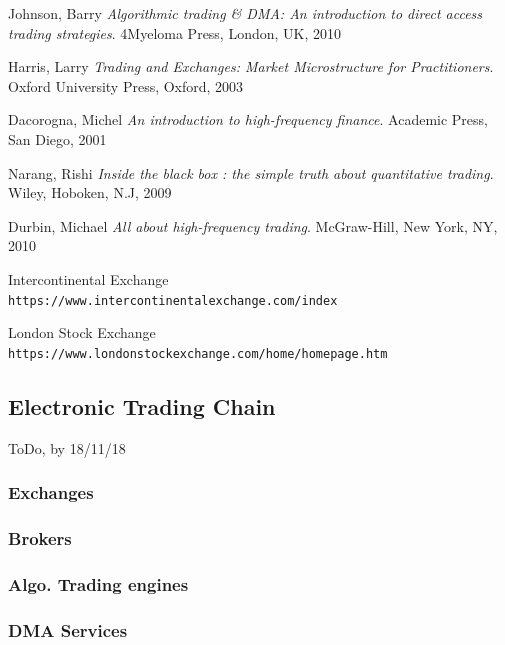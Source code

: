 \documentclass[12pt]{article}
\begin{document}
\begin{thebibliography}{9}

%

Johnson, Barry
\textit{Algorithmic trading \& DMA: An introduction to direct access trading strategies}.
4Myeloma Press, London, UK, 2010

Harris, Larry
\textit{Trading and Exchanges: Market Microstructure for Practitioners}.
Oxford University Press, Oxford, 2003

Dacorogna, Michel
\textit{An introduction to high-frequency finance}.
Academic Press, San Diego, 2001

Narang, Rishi
\textit{Inside the black box : the simple truth about quantitative trading}.
Wiley, Hoboken, N.J, 2009

Durbin, Michael
\textit{All about high-frequency trading}.
McGraw-Hill, New York, NY, 2010

Intercontinental Exchange
\\\texttt{https://www.intercontinentalexchange.com/index}

London Stock Exchange
\\\texttt{https://www.londonstockexchange.com/home/homepage.htm}


\end{thebibliography}


\subsection{Electronic Trading Chain}
\label{sec:Chian}
ToDo, by 18/11/18
\subsubsection{Exchanges}
\subsubsection{Brokers}
\subsubsection{Algo. Trading engines}
\subsubsection{DMA Services}
\end{document}
